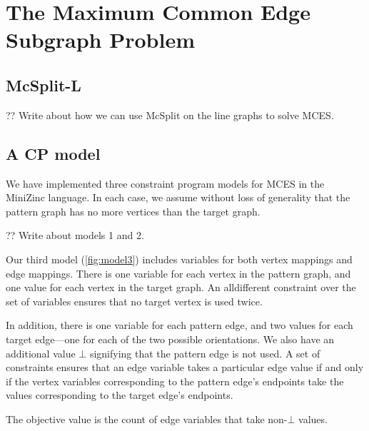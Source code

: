 \chapter{The Maximum Common Edge Subgraph Problem}
\label{c:mcsplite}

\section{McSplit-L}

?? Write about how we can use McSplit on the line graphs to solve MCES.

\section{A CP model}

We have implemented three constraint program models for MCES in the MiniZinc language.
In each case, we assume without loss of generality that the pattern graph has no more vertices than the target graph.

?? Write about models 1 and 2.

Our third model (\cref{fig:model3}) includes variables for both vertex mappings and edge mappings.
There is one variable for each vertex in the pattern graph, and one value
for each vertex in the target graph.  An alldifferent constraint over the set of variables ensures
that no target vertex is used twice.  

In addition, there is one variable for each pattern edge, and two values for
each target edge---one for each of the two possible orientations.  We also have
an additional value $\bot$ signifying that the pattern edge is not used.  A set
of constraints ensures that an edge variable takes a particular edge value if
and only if the vertex variables corresponding to the pattern edge's endpoints
take the values corresponding to the target edge's endpoints.

The objective value is the count of edge variables that take non-$\bot$ values.


